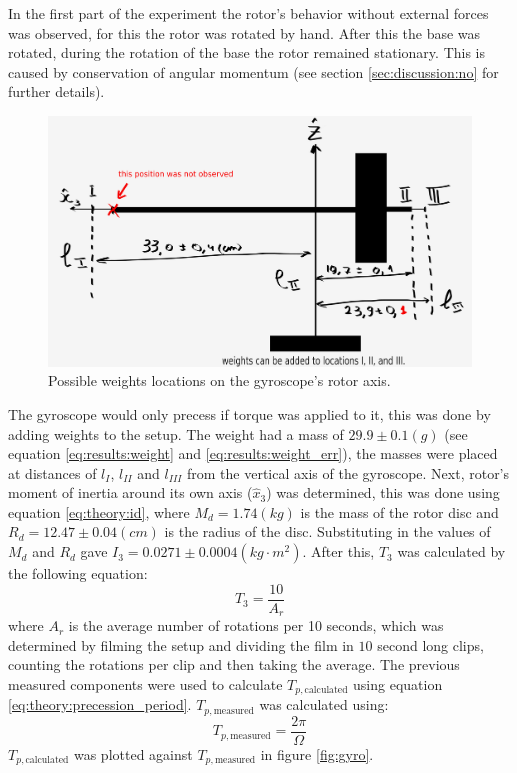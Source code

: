 \begin{multicols}{2}
 In the first part of the experiment the rotor’s behavior without external forces was observed, for this the rotor was rotated by hand. After this the base was rotated, during the rotation of the base the rotor remained stationary. This is caused by conservation of angular momentum (see section \ref{sec:discussion:no} for further details).
  
\begin{figure}[H]
  \centering
  \includegraphics[width=\columnwidth]{gyroscope/images/locs}
  \caption{Possible weights locations on the gyroscope's rotor axis. }
  \label{fig:results:locs}
\end{figure}

The gyroscope would only precess if torque was applied to it, this was done by adding weights to the setup. The weight had a mass of $29.9 \pm 0.1 (g)$ (see equation \ref{eq:results:weight} and \ref{eq:results:weight_err}), the masses were placed at distances of $l_{I}$, $l_{II}$ and $l_{III}$ from the vertical axis of the gyroscope.
Next, rotor's moment of inertia around its own axis ($\hat{x}_{3}$) was determined, this was done using equation \ref{eq:theory:id},
where $M_d = 1.74 (kg)$ is the mass of the rotor disc and $R_d = 12.47 \pm 0.04 (cm)$ is the radius of the disc. Substituting in the values of $M_d$ and $R_d$ gave $I_3 = 0.0271 \pm 0.0004 (kg \cdot m^2)$. After this, $T_3$ was calculated by the following equation:
\begin{equation*}
    T_3 = \frac{10}{A_{r}}
\end{equation*}
where $A_{r}$ is the average number of rotations per 10 seconds, which was determined by filming the setup and dividing the film in $10$ second long clips, counting the rotations per clip and then taking the average. The previous measured components were used to calculate $T_{p, \text{calculated}}$ using equation \ref{eq:theory:precession_period}. $T_{p, \text{measured}}$ was calculated using:
\begin{equation*}
    T_{p, \text{measured}} = \frac{2\pi}{\Omega}
\end{equation*}
$T_{p, \text{calculated}}$ was plotted against $T_{p, \text{measured}}$ in figure \ref{fig:gyro}.


\end{multicols}

